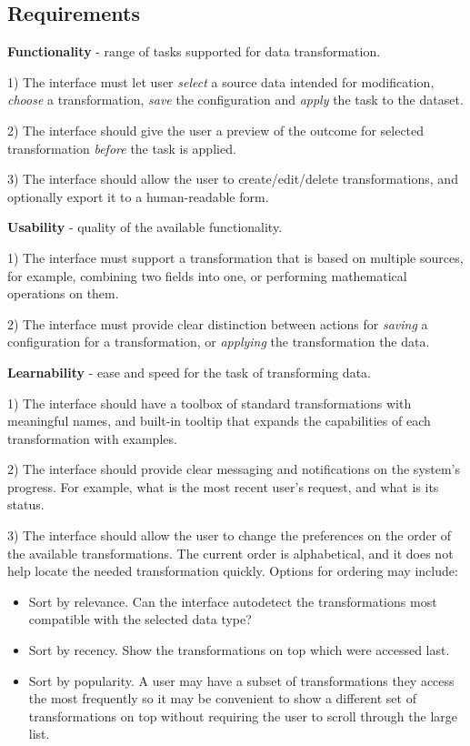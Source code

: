 \documentclass[12pt,letterpaper]{article}
\begin{document}
\subsection*{Requirements}

\textbf{Functionality} - range of tasks supported for data transformation.

1) The interface must let user \textit{select} a source data intended for modification, \textit{choose} a transformation, \textit{save} the configuration and \textit{apply} the task to the dataset.

2) The interface should give the user a preview of the outcome for selected transformation \textit{before} the task is applied.

3) The interface should allow the user to create/edit/delete transformations, and optionally export it to a human-readable form.

\textbf{Usability} - quality of the available functionality.

1) The interface must support a transformation that is based on multiple sources, for example, combining two fields into one, or performing mathematical operations on them.

2) The interface must provide clear distinction between actions for \textit{saving} a configuration for a transformation, or \textit{applying} the transformation the data.

\textbf{Learnability} - ease and speed for the task of transforming data.

1) The interface should have a toolbox of standard transformations with meaningful names, and built-in tooltip that expands the capabilities of each transformation with examples.

2) The interface should provide clear messaging and notifications on the system's progress. For example, what is the most recent user's request, and what is its status.

3) The interface should allow the user to change the preferences on the order of the available transformations. The current order is alphabetical, and it does not help locate the needed transformation quickly. Options for ordering may include: 

\begin{itemize}
    \item Sort by relevance. Can the interface autodetect the transformations most compatible with the selected data type?
    \item Sort by recency. Show the transformations on top which were accessed last.
    \item Sort by popularity. A user may have a subset of transformations they access the most frequently so it may be convenient to show a different set of transformations on top without requiring the user to scroll through the large list. 
\end{itemize}
\end{document}
